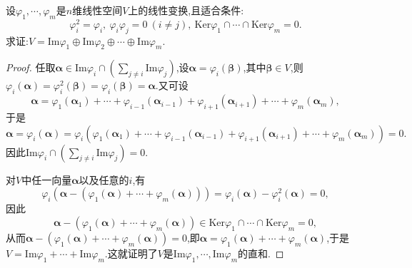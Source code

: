\documentclass[../../main.tex]{subfiles}%
\begin{document}
\begin{proposition}\label{proposition:由投影变换性质反推直和分解}
设\(\varphi_1,\cdots,\varphi_m\)是\(n\)维线性空间\(V\)上的线性变换,且适合条件:
\[
\varphi_i^2 = \varphi_i,\ \varphi_i\varphi_j = 0\ (i\neq j),\ \text{Ker}\varphi_1\cap\cdots\cap\text{Ker}\varphi_m = 0.
\]
求证:\(V = \text{Im}\varphi_1\oplus\text{Im}\varphi_2\oplus\cdots\oplus\text{Im}\varphi_m\).
\end{proposition}
\begin{proof}

任取\(\boldsymbol{\alpha}\in\text{Im}\varphi_i\cap(\sum_{j\neq i}\text{Im}\varphi_j)\),设\(\boldsymbol{\alpha}=\varphi_i(\boldsymbol{\beta})\),其中\(\boldsymbol{\beta}\in V\),则\(\varphi_i(\boldsymbol{\alpha})=\varphi_i^2(\boldsymbol{\beta})=\varphi_i(\boldsymbol{\beta})=\boldsymbol{\alpha}\).又可设
\[
\boldsymbol{\alpha}=\varphi_1(\boldsymbol{\alpha}_1)+\cdots+\varphi_{i - 1}(\boldsymbol{\alpha}_{i - 1})+\varphi_{i + 1}(\boldsymbol{\alpha}_{i + 1})+\cdots+\varphi_m(\boldsymbol{\alpha}_m),
\]
于是
\[
\boldsymbol{\alpha}=\varphi_i(\boldsymbol{\alpha})=\varphi_i(\varphi_1(\boldsymbol{\alpha}_1)+\cdots+\varphi_{i - 1}(\boldsymbol{\alpha}_{i - 1})+\varphi_{i + 1}(\boldsymbol{\alpha}_{i + 1})+\cdots+\varphi_m(\boldsymbol{\alpha}_m)) = 0.
\]
因此\(\text{Im}\varphi_i\cap(\sum_{j\neq i}\text{Im}\varphi_j)=0\).

对\(V\)中任一向量\(\boldsymbol{\alpha}\)以及任意的\(i\),有
\[
\varphi_i(\boldsymbol{\alpha}-(\varphi_1(\boldsymbol{\alpha})+\cdots+\varphi_m(\boldsymbol{\alpha})))=\varphi_i(\boldsymbol{\alpha})-\varphi_i^2(\boldsymbol{\alpha}) = 0,
\]
因此
\[
\boldsymbol{\alpha}-(\varphi_1(\boldsymbol{\alpha})+\cdots+\varphi_m(\boldsymbol{\alpha}))\in\text{Ker}\varphi_1\cap\cdots\cap\text{Ker}\varphi_m = 0,
\]
从而\(\boldsymbol{\alpha}-(\varphi_1(\boldsymbol{\alpha})+\cdots+\varphi_m(\boldsymbol{\alpha})) = 0\),即\(\boldsymbol{\alpha}=\varphi_1(\boldsymbol{\alpha})+\cdots+\varphi_m(\boldsymbol{\alpha})\),于是\(V=\text{Im}\varphi_1+\cdots+\text{Im}\varphi_m\).这就证明了\(V\)是\(\text{Im}\varphi_1,\cdots,\text{Im}\varphi_m\)的直和.

\end{proof}
\end{document}
